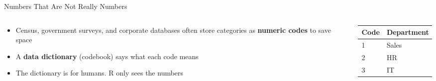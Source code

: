 \documentclass[
  ignorenonframetext,
  aspectratio=169,
]{beamer}
\providecommand{\tightlist}{%
  \setlength{\itemsep}{0pt}\setlength{\parskip}{0pt}}\usepackage{longtable,booktabs,array}
\begin{document}
\begin{frame}{Numbers That Are Not Really Numbers}
\protect\hypertarget{sec-coded}{}
\begin{columns}[T]
\begin{column}{0.55\textwidth}
\begin{itemize}
\tightlist
\item
  Census, government surveys, and corporate databases often store
  categories as \textbf{numeric codes} to save space
\item
  A \textbf{data dictionary} (codebook) says what each code means
\item
  The dictionary is for humans. R only sees the numbers
\end{itemize}
\end{column}

\begin{column}{0.45\textwidth}
\begin{longtable}[]{@{}ll@{}}
\toprule()
Code & Department \\
\midrule()
\endhead
1 & Sales \\
2 & HR \\
3 & IT \\
\bottomrule()
\end{longtable}
\end{column}
\end{columns}
\end{frame}
\end{document}
